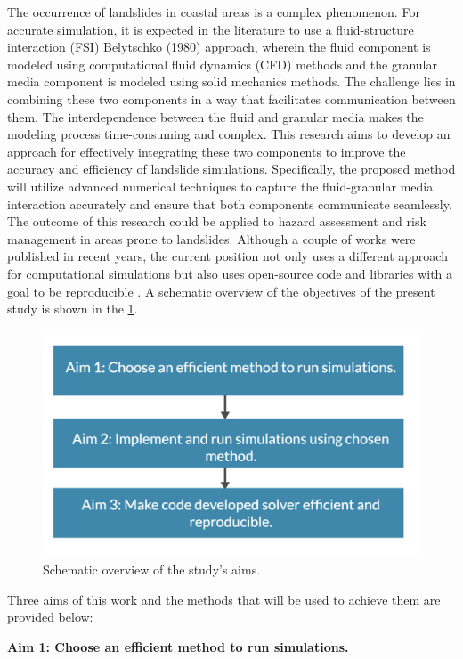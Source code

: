 The occurrence of landslides in coastal areas is a complex phenomenon. For accurate simulation, it is expected in the literature to use a fluid-structure interaction (\ac{FSI}) Belytschko (1980)\cite{belytschko1980fsi} approach, wherein the fluid component is modeled using computational fluid dynamics (CFD) methods and the granular media component is modeled using solid mechanics methods. The challenge lies in combining these two components in a way that facilitates communication between them. The interdependence between the fluid and granular media makes the modeling process time-consuming and complex. This research aims to develop an approach for effectively integrating these two components to improve the accuracy and efficiency of landslide simulations. Specifically, the proposed method will utilize advanced numerical techniques to capture the fluid-granular media interaction accurately and ensure that both components communicate seamlessly. The outcome of this research could be applied to hazard assessment and risk management in areas prone to landslides. Although a couple of works were published in recent years, the current position not only uses a different approach for computational simulations but also uses open-source code and libraries with a goal to be reproducible \cite{NAS2019}. A schematic overview of the objectives of the present study is shown in the \ref{fig:aims}.

\begin{figure}[!ht]
    \centering
    \includegraphics[width=12cm]{GWU_Thesis_Sarmakeeva/Images/chap1/Aims.png}
    \caption{Schematic overview of the study's aims.}
    \label{fig:aims}
\end{figure}
Three aims of this work and the methods that will be used to achieve them are provided below:

\textbf{Aim 1: Choose an efficient method to run simulations.}

